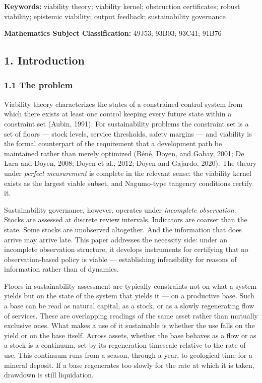 \documentclass[11pt]{article}
\begin{document}
\textbf{Keywords:} viability theory; viability kernel; obstruction
certificates; robust viability; epistemic viability; output feedback;
sustainability governance

\textbf{Mathematics Subject Classification:} 49J53; 93B03; 93C41; 91B76

\subsection{1. Introduction}\label{introduction}

\subsubsection{1.1 The problem}\label{the-problem}

Viability theory characterizes the states of a constrained control
system from which there exists at least one control keeping every future
state within a constraint set (Aubin, 1991). For sustainability problems
the constraint set is a set of floors --- stock levels, service
thresholds, safety margins --- and viability is the formal counterpart
of the requirement that a development path be maintained rather than
merely optimized (B\'en\'e, Doyen, and Gabay, 2001; De Lara and Doyen, 2008;
Doyen et al., 2012; Doyen and Gajardo, 2020). The theory under
\emph{perfect measurement} is complete in the relevant sense: the
viability kernel exists as the largest viable subset, and Nagumo-type
tangency conditions certify it.

Sustainability governance, however, operates under \emph{incomplete
observation}. Stocks are assessed at discrete review intervals.
Indicators are coarser than the state. Some stocks are unobserved
altogether. And the information that does arrive may arrive late. This
paper addresses the necessity side: under an incomplete observation
structure, it develops instruments for certifying that no
observation-based policy is viable --- establishing infeasibility for
reasons of information rather than of dynamics.

Floors in sustainability assessment are typically constraints not on
what a system yields but on the state of the system that yields it ---
on a productive base. Such a base can be read as natural capital, as a
stock, or as a slowly regenerating flow of services. These are
overlapping readings of the same asset rather than mutually exclusive
ones. What makes a use of it sustainable is whether the use falls on the
yield or on the base itself. Across assets, whether the base behaves as
a flow or as a stock is a continuum, set by its regeneration timescale
relative to the rate of use. This continuum runs from a season, through
a year, to geological time for a mineral deposit. If a base regenerates
too slowly for the rate at which it is taken, drawdown is still
liquidation.
\end{document}
